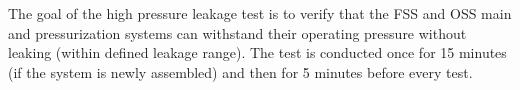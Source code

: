 The goal of the high pressure leakage test is to verify that the FSS and OSS main and pressurization systems can withstand their operating pressure without leaking (within defined leakage range). The test is conducted once for 15 minutes (if the system is newly assembled) and then for 5 minutes before every test. 
